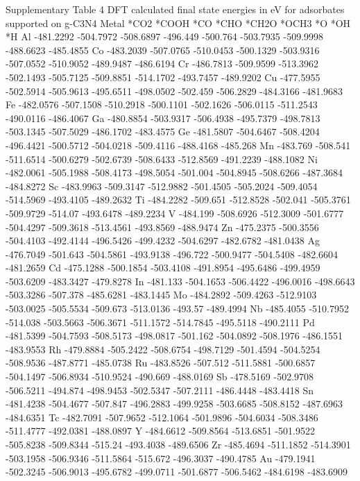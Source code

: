Supplementary Table 4
DFT calculated final state energies in eV for adsorbates supported on g-C3N4
Metal	*CO2	*COOH	*CO	*CHO	*CH2O	*OCH3	*O	*OH	*H
Al	-481.2292	-504.7972	-508.6897	-496.449	-500.764	-503.7935	-509.9998	-488.6623	-485.4855
Co	-483.2039	-507.0765	-510.0453	-500.1329	-503.9316	-507.0552	-510.9052	-489.9487	-486.6194
Cr	-486.7813	-509.9599	-513.3962	-502.1493	-505.7125	-509.8851	-514.1702	-493.7457	-489.9202
Cu	-477.5955	-502.5914	-505.9613	-495.6511	-498.0502	-502.459	-506.2829	-484.3166	-481.9683
Fe	-482.0576	-507.1508	-510.2918	-500.1101	-502.1626	-506.0115	-511.2543	-490.0116	-486.4067
Ga	-480.8854	-503.9317	-506.4938	-495.7379	-498.7813	-503.1345	-507.5029	-486.1702	-483.4575
Ge	-481.5807	-504.6467	-508.4204	-496.4421	-500.5712	-504.0218	-509.4116	-488.4168	-485.268
Mn	-483.769	-508.541	-511.6514	-500.6279	-502.6739	-508.6433	-512.8569	-491.2239	-488.1082
Ni	-482.0061	-505.1988	-508.4173	-498.5054	-501.004	-504.8945	-508.6266	-487.3684	-484.8272
Sc	-483.9963	-509.3147	-512.9882	-501.4505	-505.2024	-509.4054	-514.5969	-493.4105	-489.2632
Ti	-484.2282	-509.651	-512.8528	-502.041	-505.3761	-509.9729	-514.07		-493.6478	-489.2234
V	-484.199	-508.6926	-512.3009	-501.6777	-504.4297	-509.3618	-513.4561	-493.8569	-488.9474
Zn	-475.2375	-500.3556	-504.4103	-492.4144	-496.5426	-499.4232	-504.6297	-482.6782	-481.0438
Ag	-476.7049	-501.643	-504.5861	-493.9138	-496.722	-500.9477	-504.5408	-482.6604	-481.2659
Cd	-475.1288	-500.1854	-503.4108	-491.8954	-495.6486	-499.4959	-503.6209	-483.3427	-479.8278
In	-481.133	-504.1653	-506.4422	-496.0016	-498.6643	-503.3286	-507.378	-485.6281	-483.1445
Mo	-484.2892	-509.4263	-512.9103	-503.0025	-505.5534	-509.673	-513.0136	-493.57		-489.4994
Nb	-485.4055	-510.7952	-514.038	-503.5663	-506.3671	-511.1572	-514.7845	-495.5118	-490.2111
Pd	-481.5399	-504.7593	-508.5173	-498.0817	-501.162	-504.0892	-508.1976	-486.1551	-483.9553
Rh	-479.8884	-505.2422	-508.6754	-498.7129	-501.4594	-504.5254	-508.9536	-487.8771	-485.0738
Ru	-483.8526	-507.512	-511.5881	-500.6857	-504.1497	-506.8934	-510.9524	-490.669	-488.0169
Sb	-478.5169	-502.9708	-506.5211	-494.874	-498.9453	-502.5347	-507.2111	-486.4448	-483.4418
Sn	-481.4238	-504.4677	-507.847	-496.2883	-499.9258	-503.6685	-508.8152	-487.6963	-484.6351
Tc	-482.7091	-507.9652	-512.1064	-501.9896	-504.6034	-508.3486	-511.4777	-492.0381	-488.0897
Y	-484.6612	-509.8564	-513.6851	-501.9522	-505.8238	-509.8344	-515.24		-493.4038	-489.6506
Zr	-485.4694	-511.1852	-514.3901	-503.1958	-506.9346	-511.5864	-515.672	-496.3037	-490.4785
Au	-479.1941	-502.3245	-506.9013	-495.6782	-499.0711	-501.6877	-506.5462	-484.6198	-483.6909
